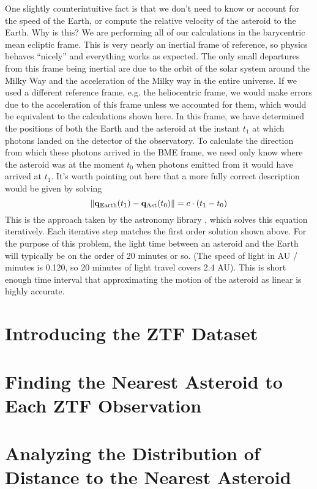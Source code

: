 One slightly counterintuitive fact is that we don't need to know or account for the speed of the Earth, 
or compute the relative velocity of the asteroid to the Earth. 
Why is this?
We are performing all of our calculations in the barycentric mean ecliptic frame.
This is very nearly an inertial frame of reference, so physics behaves ``nicely'' and everything works as expected.
The only small departures from this frame being inertial are due to the orbit of the solar system around the Milky Way
and the acceleration of the Milky way in the entire universe.
If we used a different reference frame, e.g. the heliocentric frame, we would make errors due to the acceleration of this frame 
unless we accounted for them, which would be equivalent to the calculations shown here.
In this frame, we have determined the positions of both the Earth and the asteroid at the instant $t_1$ at which 
photons landed on the detector of the observatory.
To calculate the direction from which these photons arrived in the BME frame, we need only know where the asteroid was at the moment
$t_0$ when photons emitted from it would have arrived at $t_1$.
It's worth pointing out here that a more fully correct description would be given by solving
$$ \lVert\mathbf{q}_{\mathrm{Earth}}(t_1) - \mathbf{q}_{\mathrm{Ast}}(t_0)\rVert = c \cdot (t_1 - t_0) $$
This is the approach taken by the astronomy library , which solves this equation iteratively.
Each iterative step matches the first order solution shown above.
For the purpose of this problem, the light time between an asteroid and the Earth will typically be on the order of 20 minutes or so.
(The speed of light in AU / minutes is 0.120, so 20 minutes of light travel covers 2.4 AU).
This is short enough time interval that approximating the motion of the asteroid as linear is highly accurate.

\section{Introducing the ZTF Dataset}
\label{section_ztf}

\section{Finding the Nearest Asteroid to Each ZTF Observation}
\label{section_ztf_nearest_ast}

\section{Analyzing the Distribution of Distance to the Nearest Asteroid}
\label{section_nearest_ast_distribution}

